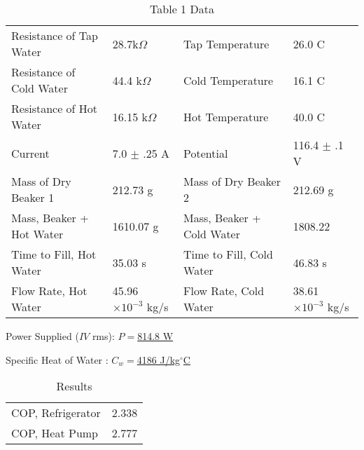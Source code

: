 \documentclass[twocolumn,english]{IEEEtran}
\theoremstyle{plain}
\theoremstyle{plain}
\begin{document}
\begin{table}[h]
\centering
\caption{Table 1 Data}
\label{tb:data}
\begin{tabular}{@{}llll@{}}
\toprule
Resistance of Tap Water  & 28.7k$\Omega$               & Tap Temperature           & 26.0 C                      \\
Resistance of Cold Water & 44.4 k$\Omega$              & Cold Temperature          & 16.1 C                      \\
Resistance of Hot Water  & 16.15 k$\Omega$             & Hot Temperature           & 40.0 C                      \\
Current                  & 7.0 $\pm$ .25 A             & Potential                 & 116.4 $\pm$ .1 V            \\ \midrule
Mass of Dry Beaker 1     & 212.73 g                    & Mass of Dry Beaker 2      & 212.69 g                    \\
Mass, Beaker + Hot Water & 1610.07 g                   & Mass, Beaker + Cold Water & 1808.22                     \\ \midrule
Time to Fill, Hot Water  & 35.03 s                     & Time to Fill, Cold Water  & 46.83 s                     \\
Flow Rate, Hot Water     & 45.96 $\times 10^{-3}$ kg/s & Flow Rate, Cold Water     & 38.61 $\times 10^{-3}$ kg/s \\ \bottomrule
\end{tabular}
\end{table}

Power Supplied ($IV$ rms): \underline{$P = $814.8 W}

Specific Heat of Water : \underline{$C_w = $4186 J/kg$^{\circ}$C}

\begin{table}[h]
\centering
\caption{Results}
\label{tb:results}
\begin{tabular}{@{}ll@{}}
\toprule
COP, Refrigerator & 2.338 \\
COP, Heat Pump    & 2.777\\ \bottomrule
\end{tabular}
\end{table}


%
%
\end{document}
